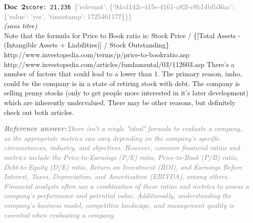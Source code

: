 \documentclass[a4paper,11pt]{article}
\begin{document}
\begin{docenv}
{\footnotesize\textcolor{doccolor}{\textbf{Doc~2}}}\hfill{\tiny\texttt{score:~21.236}}\ {\tiny\textcolor{gray}{\{'relevant': \{'9dcd142c-415e-4161-a82f-c8b14bfb36ac': \{'value': 'yes', 'timestamp': 1725461177\}\}\}}}\\[3pt]
{\small\textit{(sans titre)}}\\[2pt]
\vspace{2pt}
{\footnotesize 
Note that the formula for Price to Book ratio is:  Stock Price / \{[Total Assets - (Intangible Assets + Liabilities)] / Stock Outstanding\}  http://www.investopedia.com/terms/p/price-to-bookratio.asp  http://www.investopedia.com/articles/fundamental/03/112603.asp  There's a number of factors that could lead to a lower than 1. The primary reason, imho, could be the company is in a state of retiring stock with debt. The company is selling penny stocks (only to get people more interested in it's later development) which are inherently undervalued. There may be other reasons, but definitely check out both articles.}
\end{docenv}
\begin{refanswerenv}
{\footnotesize\textit{\textcolor{gray}{\textbf{Reference answer:}\enspace There isn't a single "ideal" formula to evaluate a company, as the appropriate metrics can vary depending on the company's specific circumstances, industry, and objectives. However, common financial ratios and metrics include the Price-to-Earnings (P/E) ratio, Price-to-Book (P/B) ratio, Debt-to-Equity (D/E) ratio, Return on Investment (ROI), and Earnings Before Interest, Taxes, Depreciation, and Amortization (EBITDA), among others. Financial analysts often use a combination of these ratios and metrics to assess a company's performance and potential value. Additionally, understanding the company's business model, competitive landscape, and management quality is essential when evaluating a company.}}}
\end{refanswerenv}
\end{document}
